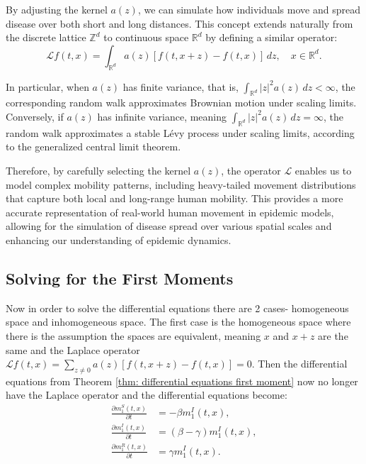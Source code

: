 \documentclass[sn-basic]{sn-jnl}%
\theoremstyle{thmstyleone}%
\theoremstyle{thmstyletwo}%
\theoremstyle{thmstylethree}%
\numberwithin{equation}{theorem}
\begin{document}
By adjusting the kernel $a(z)$, we can simulate how individuals move and spread disease over both short and long distances. This concept extends naturally from the discrete lattice $\mathbb{Z}^d$ to continuous space $\mathbb{R}^d$ by defining a similar operator:
\[
\mathcal{L} f(t, x) = \int_{\mathbb{R}^d} a(z) [f(t, x + z) - f(t, x)] \, dz, \quad x \in \mathbb{R}^d.
\]

In particular, when $a(z)$ has finite variance, that is, $\int_{\mathbb{R}^d} |z|^2 a(z) \, dz < \infty$, the corresponding random walk approximates Brownian motion under scaling limits. Conversely, if $a(z)$ has infinite variance, meaning $\int_{\mathbb{R}^d} |z|^2 a(z) \, dz = \infty$, the random walk approximates a stable Lévy process under scaling limits, according to the generalized central limit theorem.

Therefore, by carefully selecting the kernel $a(z)$, the operator $\mathcal{L}$ enables us to model complex mobility patterns, including heavy-tailed movement distributions that capture both local and long-range human mobility. This provides a more accurate representation of real-world human movement in epidemic models, allowing for the simulation of disease spread over various spatial scales and enhancing our understanding of epidemic dynamics.




\subsection{Solving for the First Moments}

Now in order to solve the differential equations there are 2 cases- homogeneous space and inhomogeneous space. The first case is the homogeneous space where there is the assumption the spaces are equivalent, meaning $x$ and $x+z$ are the same and the Laplace operator $\mathcal{L} f(t,x)= \sum\limits_{z \neq 0} a(z)[f(t,x+z)-f(t,x)]=0$. Then the differential equations from Theorem \ref{thm: differential equations first moment} now no longer have the Laplace operator and the differential equations become:
\begin{align}
    \label{eq: sus diff equation from thm 1 without L}
    \displaystyle \frac{\partial m_{1}^{S}(t,x)}{\partial t} &= - \beta m_{1}^{I}(t,x),\\
    \label{eq: inf diff equation from thm 1 without L}
    \displaystyle \frac{\partial m_{1}^{I}(t,x)}{\partial t} &= (\beta - \gamma) m_{1}^{I}(t,x),\\
    \label{eq: rec diff equation from thm 1 without L}
    \displaystyle \frac{\partial m_{1}^{R}(t,x)}{\partial t} &= \gamma m_{1}^{I}(t,x).
\end{align}
\end{document}
